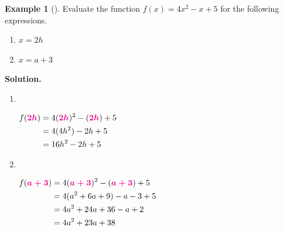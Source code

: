 \documentclass[10pt,]{book}
\theoremstyle{plain}
\theoremstyle{definition}
\theoremstyle{definition}
\newtheorem{example}[theorem]{Example}
\theoremstyle{definition}
\theoremstyle{definition}
\numberwithin{equation}{part}
\newcommand{\alert}[1]{\boldsymbol{\color{magenta}{#1}}}
\newcommand{\amp}{&}
\begin{document}
\begin{example}[]\label{example-evaluate-quadratic}
Evaluate the function \(f(x)=4x^2 - x + 5\) for the following expressions.%
\leavevmode%
\begin{enumerate}[label=\alph*]
\item\hypertarget{li-311}{}\(x = 2h\)%
\item\hypertarget{li-312}{}\(x = a + 3\)%
\end{enumerate}
\par\medskip\noindent%
\textbf{Solution.}\quad \leavevmode%
\begin{enumerate}[label=\alph*]
\item\hypertarget{li-313}{}~%
\par
\(\begin{aligned}
f(\alert{2h}) \amp= 4(\alert{2h})^2-(\alert{2h}) + 5\\
\amp= 4(4h^2)-2h+5\\
\amp= 16h^2 - 2h + 5\\ 
\end{aligned}\)%
\item\hypertarget{li-314}{}~%
\par
\(\begin{aligned}
f(\alert{a+3}) \amp= 4(\alert{a+3})^2-(\alert{a+3})+5\\
\amp= 4(a^2+6a+9)-a-3+5\\
\amp= 4a^2+24a+36 - a + 2\\
\amp= 4a^2+23a + 38\\
\end{aligned}\)%
\end{enumerate}
\end{example}
\typeout{************************************************}
\typeout{************************************************}
\end{document}
